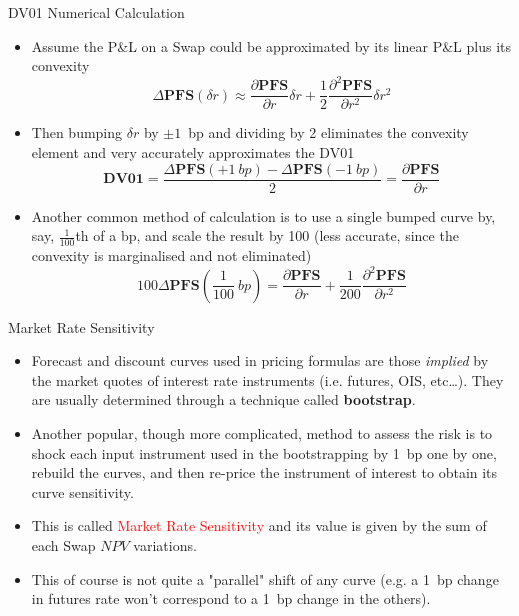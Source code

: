 \documentclass{beamer}
\begin{document}

\begin{frame}{DV01 Numerical Calculation}
\begin{itemize}
	\item<1-> Assume the P\&L on a Swap could be approximated by its linear P\&L plus its convexity
	\begin{equation*}
	\Delta \textbf{PFS}(\delta r)\approx \frac{\partial \textbf{PFS} }{\partial r}\delta r + \frac{1}{2}\frac{\partial^2 \textbf{PFS}}{\partial r^2}\delta r^2
	\end{equation*}
	\item<2-> Then bumping $\delta r$ by $\pm 1$~bp and dividing by 2 eliminates the convexity element and very accurately approximates the DV01
	\begin{equation*}
	\textbf{DV01} = \frac{\Delta \textbf{PFS}(+1~bp)-\Delta \textbf{PFS}(-1~bp)}{2}=\frac{\partial \textbf{PFS} }{\partial r}
	\end{equation*}
	\item<3-> Another common method of calculation is to use a single bumped curve by, say, $\frac{1}{100}$th of a bp, and scale the result by 100 (less accurate, since the convexity is marginalised and not eliminated)
	\begin{equation*}
	100\Delta \textbf{PFS}\left(\frac{1}{100}~bp\right)=\frac{\partial \textbf{PFS}}{\partial r}+\frac{1}{200}\frac{\partial^2\textbf{PFS}}{\partial r^2}
	\end{equation*}
	\end{itemize}
\end{frame}

\begin{frame}{Market Rate Sensitivity}
\begin{itemize}
	\item<1-> Forecast and discount curves used in pricing formulas are those \emph{implied} by the market quotes of interest rate instruments (i.e. futures, OIS, etc\ldots). They are usually determined through a technique called \textbf{bootstrap}.
	\item<2-> Another popular, though more complicated, method to assess the risk is to shock each input instrument used in the bootstrapping by 1~bp one by one, rebuild the curves, and then re-price the instrument of interest to obtain its curve sensitivity. 
	\item<3-> This is called \textcolor{red}{Market Rate Sensitivity} and its value is given by the sum of each Swap $NPV$ variations.
	\item<4-> This of course is not quite a "parallel" shift of any curve (e.g. a 1~bp change in futures rate won't correspond to a 1~bp change in the others).
\end{itemize}
\end{frame}
\end{document}
